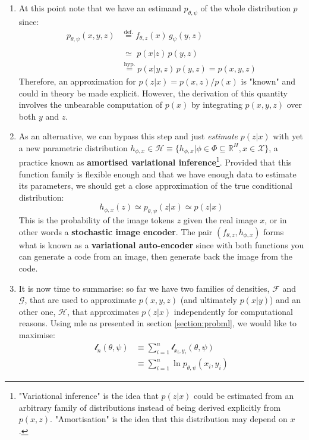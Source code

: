 \documentclass{article}
\begin{document}
\begin{multicols}{2}
\begin{enumerate}
    \item At this point note that we have an estimand $p_{\theta,\psi}$ of the whole distribution $p$ since: \begin{align*}
        p_{\theta,\psi}(x,y,z) & \overset{\text{def.}}{=} f_{\theta,z}(x) \, g_{\psi}(y,z) \\
        & \overset{\phantom{\text{def.}}}{\simeq} \, p(x|z) \, p(y,z) \\
        & \overset{\text{hyp.}}{=} p(x|y,z) \, p(y,z)=p(x,y,z)
    \end{align*}
    Therefore, an approximation for $p(z|x)=p(x,z)/p(x)$ is "known" and could in theory be made explicit. However, the derivation of this quantity involves the unbearable computation of $p(x)$ by integrating $p(x,y,z)$ over both $y$ and $z$.
    
    \item As an alternative, we can bypass this step and just \textit{estimate} $p(z|x)$ with yet a new parametric distribution $h_{\phi,x}\in \mathcal{H}\equiv \{h_{\phi,x}|\phi\in\Phi\subseteq\mathbb{R}^{H},x\in\mathcal{X}\}$, a practice known as \textbf{amortised variational inference}\footnote{"Variational inference" is the idea that $p(z|x)$ could be estimated from an arbitrary family of distributions instead of being derived explicitly from $p(x,z)$. "Amortisation" is the idea that this distribution may depend on $x$.}. Provided that this function family is flexible enough and that we have enough data to estimate its parameters, we should get a close approximation of the true conditional distribution:
    $$h_{\phi,x}(z)\simeq p_{\theta,\psi}(z|x)\simeq p(z|x)$$
    This is the probability of the image tokens $z$ given the real image $x$, or in other words a \textbf{stochastic image encoder}. The pair $(f_{\theta,z}, h_{\phi,x})$ forms what is known as a \textbf{variational auto-encoder} since with both functions you can generate a code from an image, then generate back the image from the code.
    
    \item It is now time to summarise: so far we have two families of densities, $\mathcal{F}$ and $\mathcal{G}$, that are used to approximate $p(x,y,z)$ (and ultimately $p(x|y)$) and an other one, $\mathcal{H}$, that approximates $p(z|x)$ independently for computational reasons. Using \gls{mle} as presented in section \ref{section:probml}, we would like to maximise: \begin{align*}\mathscr{l}_n(\theta,\psi) & \equiv \sum_{i=1}^n \mathscr{l}_{x_i,y_i}(\theta,\psi) \\ & \equiv \sum_{i=1}^n \ln p_{\theta,\psi}(x_i,y_i)\end{align*}
    

\end{enumerate}
\end{multicols}
\end{document}
